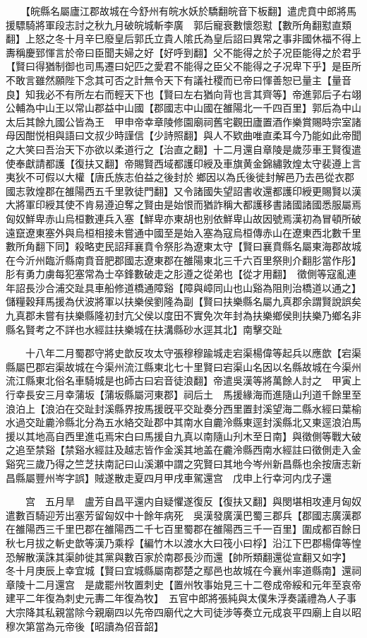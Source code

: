　　【皖縣名屬廬江郡故城在今舒州有皖水妖於驕翻皖音下板翻】遣虎賁中郎將馬援驃騎將軍段志討之秋九月破皖城斬李廣　郭后寵衰數懷怨懟【數所角翻懟直類翻】上怒之冬十月辛巳廢皇后郭氏立貴人隂氏為皇后詔曰異常之事非國休福不得上夀稱慶郅惲言於帝曰臣聞夫婦之好【好呼到翻】父不能得之於子况臣能得之於君乎【賢曰得猶制御也司馬遷曰妃匹之愛君不能得之臣父不能得之子况卑下乎】是臣所不敢言雖然願陛下念其可否之計無令天下有議社稷而已帝曰惲善恕已量主【量音良】知我必不有所左右而輕天下也【賢曰左右猶向背也言其齊等】帝進郭后子右翊公輔為中山王以常山郡益中山國【郡國志中山國在雒陽北一千四百里】郭后為中山太后其餘九國公皆為王　甲申帝幸章陵修園廟祠舊宅觀田廬置酒作樂賞賜時宗室諸母因酣悦相與語曰文叔少時謹信【少詩照翻】與人不欵曲唯直柔耳今乃能如此帝聞之大笑曰吾治天下亦欲以柔道行之【治直之翻】十二月還自章陵是歲莎車王賢復遣使奉獻請都護【復扶又翻】帝賜賢西域都護印綬及車旗黄金錦繡敦煌太守裴遵上言夷狄不可假以大權【唐氏族志伯益之後封於鄉因以為氏後徙封解邑乃去邑從衣郡國志敦煌郡在雒陽西五千里敦徒門翻】又令諸國失望詔書收還都護印綬更賜賢以漢大將軍印綬其使不肯易遵迫奪之賢由是始恨而猶詐稱大都護移書諸國諸國悉服屬焉匈奴鮮卑赤山烏桓數連兵入塞【鮮卑亦東胡也别依鮮卑山故因號焉漢初為冒頓所破遠竄遼東塞外與烏桓相接未嘗通中國至是始入塞為寇烏桓傳赤山在遼東西北數千里數所角翻下同】殺略吏民詔拜襄賁令祭肜為遼東太守【賢曰襄賁縣名屬東海郡故城在今沂州臨沂縣南賁音肥郡國志遼東郡在雒陽東北三千六百里祭則介翻肜當作彤】肜有勇力虜每犯塞常為士卒鋒數破走之肜遵之從弟也【從才用翻】　徵側等寇亂連年詔長沙合浦交趾具車船修道橋通障谿【障與嶂同山也山谿為阻則治橋道以通之】儲糧穀拜馬援為伏波將軍以扶樂侯劉隆為副【賢曰扶樂縣名屬九真郡余謂賢說誤矣九真郡未嘗有扶樂縣隆初封亢父侯以度田不實免次年封為扶樂鄉侯則扶樂乃鄉名非縣名賢考之不詳也水經註扶樂城在扶溝縣砂水逕其北】南擊交趾

　　十八年二月蜀郡守將史歆反攻太守張穆穆踰城走宕渠楊偉等起兵以應歆【宕渠縣屬巴郡宕渠故城在今渠州流江縣東北七十里賢曰宕渠山名因以名縣故城在今渠州流江縣東北俗名車騎城是也師古曰宕音徒浪翻】帝遣吳漢等將萬餘人討之　甲寅上行幸長安三月幸蒲坂【蒲坂縣屬河東郡】祠后土　馬援緣海而進隨山刋道千餘里至浪泊上【浪泊在交趾封溪縣界按馬援旣平交趾奏分西里置封溪望海二縣水經曰葉榆水過交趾麊泠縣北分為五水絡交趾郡中其南水自麊泠縣東逕封溪縣北又東逕浪泊馬援以其地高自西里進屯焉宋白曰馬援自九真以南隨山刋木至日南】與徵側等戰大破之追至禁谿【禁谿水經註及越志皆作金溪其地盖在麊泠縣西南水經註曰徵側走入金谿究三歲乃得之竺芝扶南記曰山溪瀬中謂之究賢曰其地今岑州新昌縣也余按唐志新昌縣屬豐州岑字誤】賊遂散走夏四月甲戌車駕還宫　戊申上行幸河内戊子還

　　宫　五月旱　盧芳自昌平還内自疑懼遂復反【復扶又翻】與閔堪相攻連月匈奴遣數百騎迎芳出塞芳留匈奴中十餘年病死　吳漢發廣漢巴蜀三郡兵【郡國志廣漢郡在雒陽西三千里巴郡在雒陽西二千七百里蜀郡在雒陽西三千一百里】圍成都百餘日秋七月拔之斬史歆等漢乃乘桴【編竹木以渡水大曰筏小曰桴】沿江下巴郡楊偉等惶恐解散漢誅其渠帥徙其黨與數百家於南郡長沙而還【帥所類翻還從宣翻又如字】　冬十月庚辰上幸宜城【賢曰宜城縣屬南郡楚之鄢邑也故城在今襄州率道縣南】還祠章陵十二月還宫　是歲罷州牧置刺史【置州牧事始見三十二卷成帝綏和元年至哀帝建平二年復為刺史元夀二年復為牧】　五官中郎將張純與太僕朱浮奏議禮為人子事大宗降其私親當除今親廟四以先帝四廟代之大司徒涉等奏立元成哀平四廟上自以昭穆次第當為元帝後【昭讀為佋音韶】

